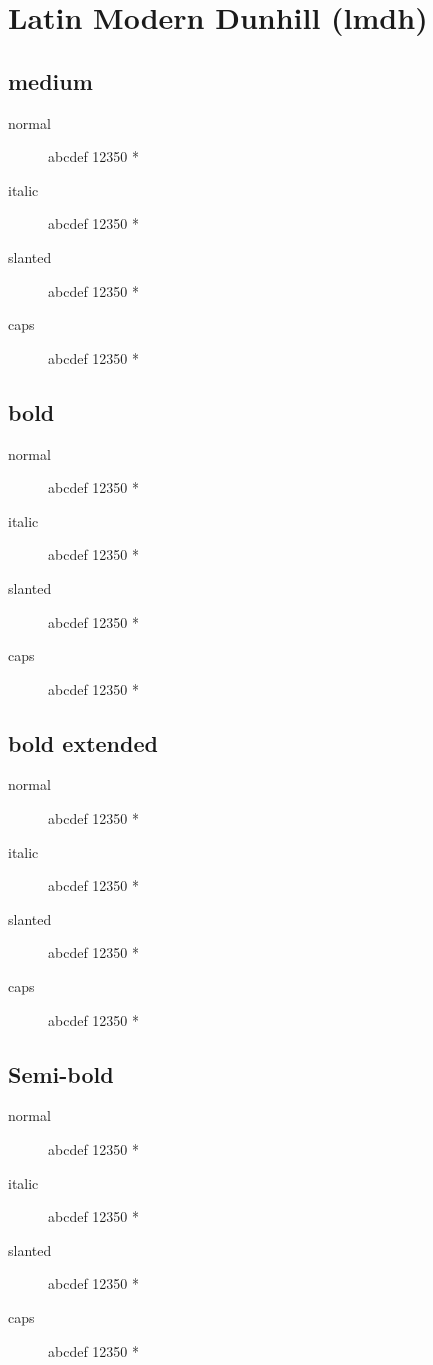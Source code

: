 \section{Latin Modern Dunhill (lmdh)}

\subsection{medium}
\begin{description}
    \item [normal]  abcdef 12350 *
    \item [italic]  abcdef 12350 *
    \item [slanted]  abcdef 12350 *
    \item [caps]  abcdef 12350 *
\end{description}
    
\subsection{bold}
\begin{description}
    \item [normal]  abcdef 12350 *
    \item [italic]  abcdef 12350 *
    \item [slanted]  abcdef 12350 *
    \item [caps]  abcdef 12350 *
\end{description}
    
\subsection{bold extended}
\begin{description}
    \item [normal]  abcdef 12350 *
    \item [italic]  abcdef 12350 *
    \item [slanted]  abcdef 12350 *
    \item [caps]  abcdef 12350 *
\end{description}

\subsection{Semi-bold}
\begin{description}
    \item [normal]  abcdef 12350 *
    \item [italic]  abcdef 12350 *
    \item [slanted]  abcdef 12350 *
    \item [caps]  abcdef 12350 *
\end{description}

